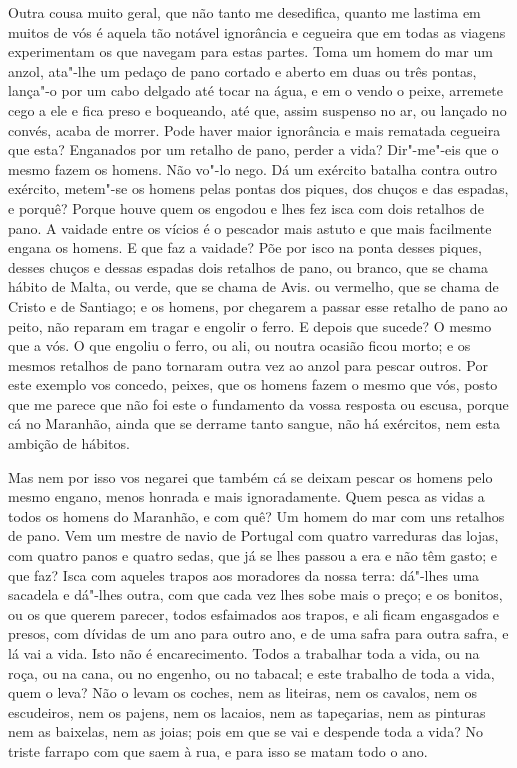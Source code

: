 Outra cousa muito geral, que não tanto me desedifica, quanto me lastima
em muitos de vós é aquela tão notável ignorância e cegueira que em todas
as viagens
experimentam os que navegam para estas partes. Toma um homem do mar um
anzol, ata"-lhe um pedaço de pano cortado e aberto em duas ou três
pontas, lança"-o por um cabo delgado até tocar na água, e em o vendo o
peixe, arremete cego a ele e fica preso e boqueando, até que, assim
suspenso no ar, ou lançado no convés, acaba de morrer. Pode haver maior
ignorância e mais rematada cegueira que esta? Enganados por um retalho
de pano, perder a vida?
Dir"-me"-eis que o mesmo fazem os homens. Não vo"-lo nego. Dá um exército
batalha contra outro exército, metem"-se os homens pelas pontas dos
piques, dos chuços e das espadas, e porquê? Porque houve quem os engodou
e lhes fez isca com dois retalhos de pano. A vaidade entre os vícios é o
pescador mais astuto e que mais facilmente engana os homens. E que faz a
vaidade? Põe por isco na ponta desses piques, desses chuços e dessas
espadas dois retalhos de pano, ou branco, que se chama hábito de Malta,
ou verde, que se chama de Avis. ou vermelho, que se chama de Cristo e de
Santiago; e os homens, por chegarem a passar esse retalho de pano ao
peito, não reparam em tragar e engolir o ferro. E depois que sucede? O
mesmo que a vós. O que engoliu o ferro, ou ali, ou noutra ocasião ficou
morto; e os mesmos retalhos de pano tornaram outra vez ao anzol para
pescar outros.
Por este exemplo vos concedo, peixes, que os homens fazem o mesmo que
vós, posto que me parece que não foi este o fundamento da vossa resposta
ou escusa, porque cá no Maranhão, ainda que se derrame tanto sangue, não
há exércitos, nem esta ambição de hábitos.

Mas nem por isso vos negarei que também cá se deixam pescar os homens
pelo mesmo engano, menos honrada e mais ignoradamente. Quem pesca as
vidas a todos os homens do Maranhão, e com quê? Um homem do mar com uns
retalhos de pano. Vem um mestre de navio de Portugal com quatro
varreduras das lojas, com quatro panos e quatro sedas, que já se lhes
passou a era e não têm gasto; e que faz? Isca com aqueles trapos aos
moradores da nossa terra: dá"-lhes uma sacadela e dá"-lhes outra, com que
cada vez lhes sobe mais o preço; e os bonitos, ou os que querem parecer,
todos esfaimados aos trapos, e ali ficam engasgados e presos, com
dívidas de um ano para outro ano, e de uma safra para outra safra, e lá
vai a vida. Isto não é encarecimento. Todos a trabalhar toda a vida, ou
na roça, ou na cana, ou no engenho, ou no tabacal; e este trabalho de
toda a vida, quem o leva? Não o levam os coches, nem as liteiras, nem os
cavalos, nem os escudeiros, nem os pajens, nem os lacaios, nem as
tapeçarias, nem as pinturas nem as baixelas, nem as joias; pois em que
se vai e despende toda a vida? No triste farrapo com que saem à rua, e
para isso se matam todo o ano.

